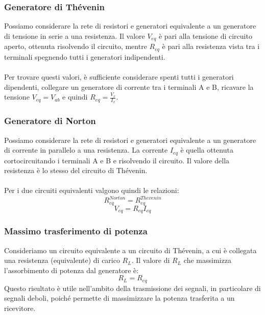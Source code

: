 \documentclass{article}
\begin{document}
\subsubsection{Generatore di Thévenin}
Possiamo considerare la rete di resistori e generatori equivalente a un generatore di tensione in serie a una resistenza.
Il valore $V_{eq}$ è pari alla tensione di circuito aperto, ottenuta risolvendo il circuito, mentre $R_{eq}$ è pari alla resistenza vista tra i terminali spegnendo tutti i generatori indipendenti.\\\\
Per trovare questi valori, è sufficiente considerare spenti tutti i generatori dipendenti, collegare un generatore di corrente tra i terminali A e B, ricavare la tensione $V_{eq}=V_{ab}$ e quindi $R_{eq}=\frac{V_x}{I_x}$.

\subsubsection{Generatore di Norton}
Possiamo considerare la rete di resistori e generatori equivalente a un generatore di corrente in parallelo a una resistenza.
La corrente $I_{eq}$ è quella ottenuta cortocircuitando i terminali A e B e risolvendo il circuito. Il valore della resistenza è lo stesso del circuito di Thévenin.\\\\
Per i due circuiti equivalenti valgono quindi le relazioni:
$$ R_{eq}^{Norton} = R_{eq}^{Thevenin}$$
$$ V_{eq} = R_{eq}I_{eq} $$

\subsubsection{Massimo trasferimento di potenza}
Consideriamo un circuito equivalente a un circuito di Thévenin, a cui è collegata una resistenza (equivalente) di carico $R_L$.
Il valore di $R_L$ che massimizza l'assorbimento di potenza dal generatore è:
$$ R_L=R_{eq} $$
Questo risultato è utile nell'ambito della trasmissione dei segnali, in particolare di segnali deboli, poiché permette di massimizzare la potenza trasferita a un ricevitore.
\end{document}

